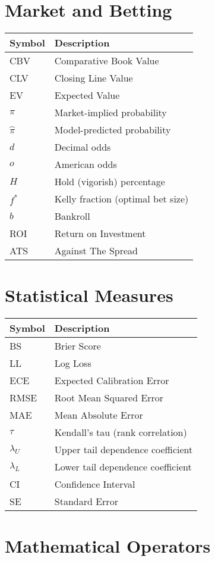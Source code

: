 \section*{Market and Betting}

\begin{tabular}{ll}
\toprule
\textbf{Symbol}  & \textbf{Description} \\
\midrule
CBV & Comparative Book Value \\
CLV & Closing Line Value \\
EV & Expected Value \\
$\pi$ & Market-implied probability \\
$\hat{\pi}$ & Model-predicted probability \\
$d$ & Decimal odds \\
$o$ & American odds \\
$H$ & Hold (vigorish) percentage \\
$f^*$ & Kelly fraction (optimal bet size) \\
$b$ & Bankroll \\
ROI & Return on Investment \\
ATS & Against The Spread \\
\bottomrule
\end{tabular}

\section*{Statistical Measures}

\begin{tabular}{ll}
\toprule
\textbf{Symbol}  & \textbf{Description} \\
\midrule
BS & Brier Score \\
LL & Log Loss \\
ECE & Expected Calibration Error \\
RMSE & Root Mean Squared Error \\
MAE & Mean Absolute Error \\
$\tau$ & Kendall's tau (rank correlation) \\
$\lambda_U$ & Upper tail dependence coefficient \\
$\lambda_L$ & Lower tail dependence coefficient \\
CI & Confidence Interval \\
SE & Standard Error \\
\bottomrule
\end{tabular}

\section*{Mathematical Operators}

